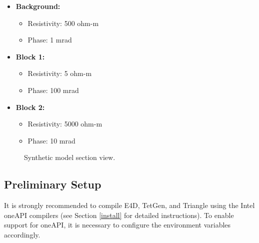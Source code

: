 \documentclass[a4paper,12pt]{article}
\begin{document}
\begin{itemize}
    \item \textbf{Background:}
          \begin{itemize}
              \item Resistivity: 500 ohm-m
              \item Phase: 1 mrad
          \end{itemize}
    \item \textbf{Block 1:}
          \begin{itemize}
              \item Resistivity: 5 ohm-m
              \item Phase: 100 mrad
          \end{itemize}
    \item \textbf{Block 2:}
          \begin{itemize}
              \item Resistivity: 5000 ohm-m
              \item Phase: 10 mrad
          \end{itemize}
\end{itemize}

\begin{figure}[H]
    \centering
    \caption{Synthetic model section view.}
    \label{fig:model}
\end{figure}

\subsection{Preliminary Setup} \label{prelim}

It is strongly recommended to compile E4D, TetGen, and Triangle using the Intel
oneAPI compilers (see Section \ref{install} for detailed instructions). To
enable support for oneAPI, it is necessary to configure the environment
variables accordingly.
\end{document}
